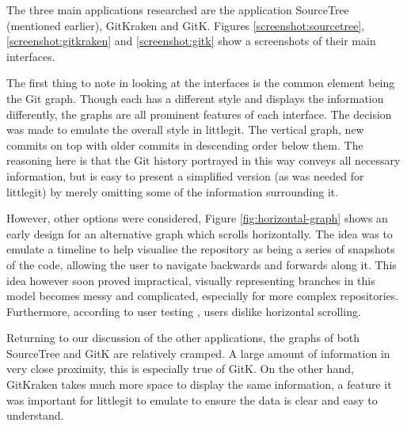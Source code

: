 The three main applications researched are the application SourceTree \cite{sourcetree} (mentioned earlier), GitKraken\cite{gitkraken} and GitK\cite{gitk}. Figures \ref{screenshot:sourcetree}, \ref{screenshot:gitkraken} and \ref{screenshot:gitk} show a screenshots of their main interfaces.




The first thing to note in looking at the interfaces is the common element being the Git graph. Though each has a different style and displays the information differently, the graphs are all prominent features of each interface. The decision was made to emulate the overall style in littlegit. The vertical graph, new commits on top with older commits in descending order below them. The reasoning here is that the Git history portrayed in this way conveys all necessary information, but is easy to present a simplified version (as was needed for littlegit) by merely omitting some of the information surrounding it.

However, other options were considered, Figure \ref{fig:horizontal-graph} shows an early design for an alternative graph which scrolls horizontally. The idea was to emulate a timeline to help visualise the repository as being a series of snapshots of the code, allowing the user to navigate backwards and forwards along it. This idea however soon proved impractical, visually representing branches in this model becomes messy and complicated, especially for more complex repositories. Furthermore, according to user testing \cite{horizontalScrolling}, users dislike horizontal scrolling.

Returning to our discussion of the other applications, the graphs of both SourceTree and GitK are relatively cramped. A large amount of information in very close proximity, this is especially true of GitK. On the other hand, GitKraken takes much more space to display the same information, a feature it was important for littlegit to emulate to ensure the data is clear and easy to understand.



